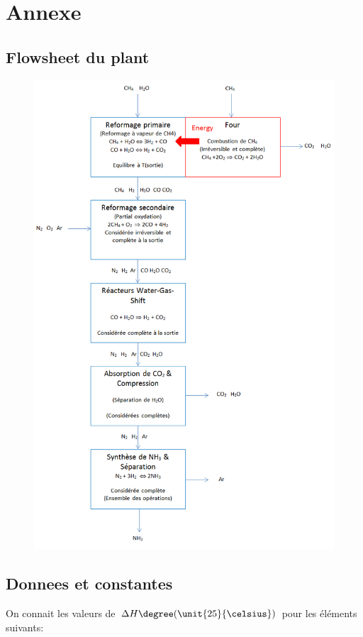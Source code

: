 \section{Annexe}

\subsection{Flowsheet du plant}

\begin{figure}[!h]
\centering
   \includegraphics[scale=0.5]{flowsh.png}
\end{figure}

\newpage

\subsection{Donnees et constantes}
On connait les valeurs de $\Delta H\degree (\unit{25}{\celsius})$ pour les éléments suivants:

